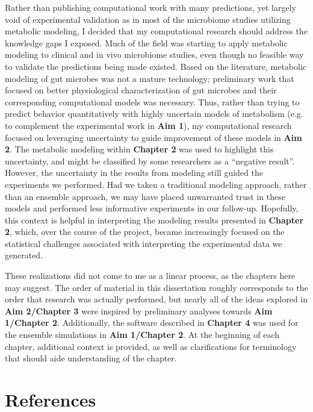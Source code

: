 \documentclass[11pt,onecolumn,notitlepage,openany,twoside]{book}
\begin{document}
\begin{refsection}
Rather than publishing computational work with many predictions, yet largely void of experimental validation as in most of the microbiome studies utilizing metabolic modeling, I decided that my computational research should address the knowledge gaps I exposed. Much of the field was starting to apply metabolic modeling to clinical and in vivo microbiome studies, even though no feasible way to validate the predictions being made existed. Based on the literature, metabolic modeling of gut microbes was not a mature technology; preliminary work that focused on better physiological characterization of gut microbes and their corresponding computational models was necessary. Thus, rather than trying to predict behavior quantitatively with highly uncertain models of metabolism (e.g. to complement the experimental work in \textbf{Aim 1}), my computational research focused on leveraging uncertainty to guide improvement of these models in \textbf{Aim 2}. The metabolic modeling within \textbf{Chapter 2} was used to highlight this uncertainty, and might be classified by some researchers as a “negative result”. However, the uncertainty in the results from modeling still guided the experiments we performed. Had we taken a traditional modeling approach, rather than an ensemble approach, we may have placed unwarranted trust in these models and performed less informative experiments in our follow-up. Hopefully, this context is helpful in interpreting the modeling results presented in \textbf{Chapter 2}, which, over the course of the project, became increasingly focused on the statistical challenges associated with interpreting the experimental data we generated.

These realizations did not come to me as a linear process, as the chapters here may suggest. The order of material in this dissertation roughly corresponds to the order that research was actually performed, but nearly all of the ideas explored in \textbf{Aim 2/Chapter 3} were inspired by preliminary analyses towards \textbf{Aim 1/Chapter 2}. Additionally, the software described in \textbf{Chapter 4} was used for the ensemble simulations in \textbf{Aim 1/Chapter 2}. At the beginning of each chapter, additional context is provided, as well as clarifications for terminology that should aide understanding of the chapter.

\section{References}

\printbibliography[heading=none]
\end{refsection}
\end{document}

